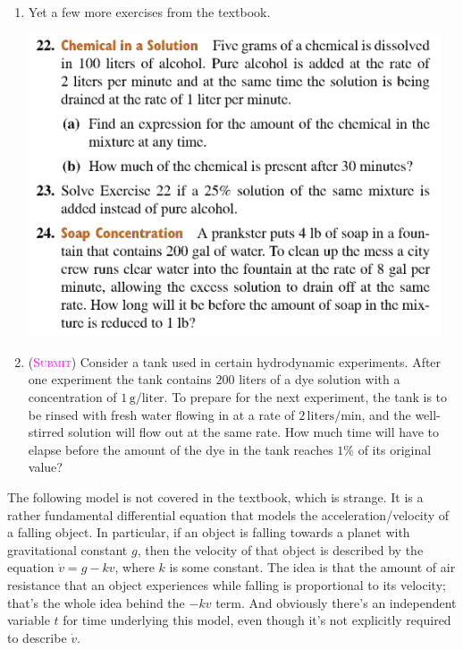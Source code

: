 \begin{enumerate}
    \item %
        Yet a few more exercises from the textbook.
        \begin{center}
            \includegraphics[width=0.96\textwidth]{screenshots/222324.png}
        \end{center}

    \item 
        (\textsc{\textcolor{magenta}{Submit}})
        Consider a tank used in certain hydrodynamic experiments.
        After one experiment the tank contains $200$ liters of a dye solution 
        with a concentration of $1\,\mathrm{g/liter}$. 
        To prepare for the next experiment, 
        the tank is to be rinsed with fresh water flowing in 
        at a rate of $2 \,\mathrm{liters/min}$, 
        and the well-stirred solution will flow out at the same rate.
        How much time will have to elapse before the amount 
        of the dye in the tank reaches $1\%$ of its original value?

\end{enumerate}
\newpage

The following model is not covered in the textbook, 
which is strange.
It is a rather fundamental differential equation that models 
the acceleration/velocity of a falling object. 
In particular, if an object is falling towards a planet
with gravitational constant $g$, then the velocity of that object 
is described by the equation $\dot{v} = g - kv$, where $k$ is some constant.
The idea is that the amount of air resistance 
that an object experiences while falling is proportional to its velocity;
that's the whole idea behind the $-kv$ term.
And obviously there's an independent variable $t$ for time 
underlying this model, 
even though it's not explicitly required to describe $\dot{v}$.

